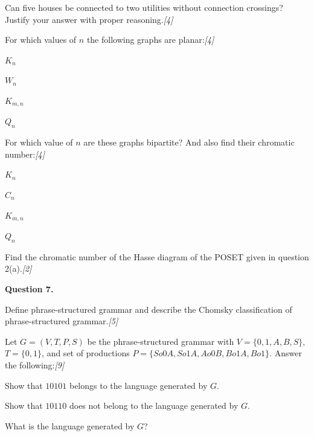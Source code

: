 \documentclass[11pt,a4paper]{article}
\newcommand{\pts}[1]{\hfill   \textit{[#1]}}
\begin{document}
\begin{parts}
  \item Can five houses be connected to two utilities without connection crossings? Justify your answer with proper reasoning.\pts{4}
  \item For which values of $n$ the following graphs are planar:\pts{4}
  
\begin{parts}
    \item $K_n$
    \item $W_n$
    \item $K_{m, n}$
    \item $Q_n$
  \end{parts}
  \item For which value of $n$ are these graphs bipartite? And also find their chromatic number:\pts{4}
  
\begin{parts}
    \item $K_n$
    \item $C_n$
    \item $K_{m, n}$
    \item $Q_n$
  \end{parts}
  \item Find the chromatic number of the Hasse diagram of the POSET given in question 2(a).\pts{2}
\end{parts}

\medskip


\noindent   \textbf{Question 7.}

\begin{parts}
  \item Define phrase-structured grammar and describe the Chomsky classification of phrase-structured grammar.\pts{5}
  \item Let $G = (V, T, P, S)$ be the phrase-structured grammar with $V = \{0, 1, A, B, S\}$, $T = \{0, 1\}$, and set of productions $P = \{S  o 0A, S  o 1A, A  o 0B, B  o 1A, B  o 1\}$. Answer the following:\pts{9}
  
\begin{parts}
    \item Show that $10101$ belongs to the language generated by $G$.
    \item Show that $10110$ does not belong to the language generated by $G$.
    \item What is the language generated by $G$?
  \end{parts}
\end{parts}
\end{document}
